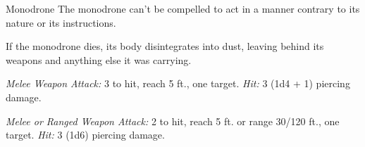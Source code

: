 \documentclass[10pt,a4paper,twoside,bg=print,twocolumn,openany,nodeprecatedcode]{dndarticle}
\begin{document}
\begin{DndMonster}[float=t]{Monodrone}
\DndMonsterBasics[
armor-class = {15 (natural armor)},
hit-points = {\DndDice{1d8 + 1}},
speed = {30 ft., fly 30 ft.}
]
\DndMonsterAbilityScores[
 str = 10,
 dex = 13,
 con = 12,
 int = 4,
 wis = 10,
 cha = 5
]
\DndMonsterDetails[
senses = {truesight 120 ft., passive perception 10},
languages = {Modron},
challenge = 1/8,
]
The monodrone can't be compelled to act in a manner contrary to its nature or its instructions.

If the monodrone dies, its body disintegrates into dust, leaving behind its weapons and anything else it was carrying.

\textsl{Melee Weapon Attack:} 3 to hit, reach 5 ft., one target. \textsl{Hit:} 3 (1d4 + 1) piercing damage.

\textsl{Melee or Ranged Weapon Attack:} 2 to hit, reach 5 ft. or range 30/120 ft., one target. \textsl{Hit:} 3 (1d6) piercing damage.

\end{DndMonster}
\end{document}
